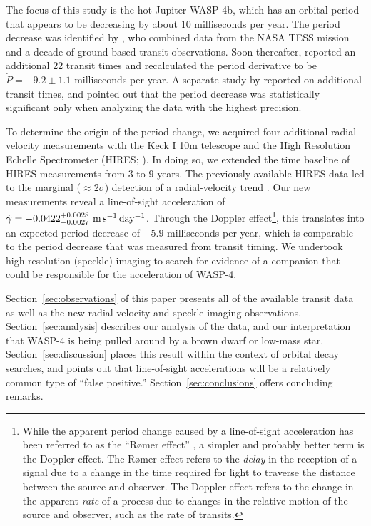 \documentclass[12pt,twocolumn,tighten]{aastex62}
\begin{document}
The focus of this study is the hot Jupiter WASP-4b, which has an
orbital period that appears to be decreasing by about 10 milliseconds
per year.  The period decrease was identified by \citep[][hereafter
]{bouma_wasp4b_2019}, who combined data
from the NASA TESS mission \citep{ricker_transiting_2015} and a decade
of ground-based transit observations. Soon thereafter,
\citet{southworth_transit_2019} reported an additional 22 transit
times and recalculated the period derivative to be $\dot{P} = -9.2 \pm
1.1$ milliseconds per year.  A separate study by \citet{baluev_2019}
reported on additional transit times, and pointed out that the period
decrease was statistically significant only when analyzing the data
with the highest precision.

To determine the origin of the period change, we acquired four
additional radial velocity measurements with the Keck I 10m telescope
and the High Resolution Echelle Spectrometer (HIRES;
\citealt{vogt_hires_1994}).  In doing so, we extended the time
baseline of HIRES measurements from 3 to 9 years.  The previously
available HIRES data led to the marginal ($\approx$$2\sigma$)
detection of a radial-velocity trend \citep{knutson_friends_2014}.
Our new measurements reveal a line-of-sight acceleration of
$\dot{\gamma} = -0.0422^{+0.0028}_{-0.0027}\ {\rm
m\,s^{-1}\,day^{-1}}$.  Through the Doppler effect\footnote{While the
apparent period change caused by a line-of-sight acceleration has been
referred to as the ``R{\o}mer effect'' \citep{yee_orbit_2020}, a
simpler and probably better term is the Doppler effect. The R{\o}mer
effect refers to the {\it delay} in the reception of a signal due to a
change in the time required for light to traverse the distance between
the source and observer. The Doppler effect refers to the change in
the apparent {\it rate} of a process due to changes in the relative
motion of the source and observer, such as the rate of transits.},
this translates into an expected period decrease of $-5.9$
milliseconds per year, which is comparable to the period decrease that
was measured from transit timing.  We undertook high-resolution
(speckle) imaging to search for evidence of a companion that could be
responsible for the acceleration of WASP-4.

Section~\ref{sec:observations} of this paper presents all of the
available transit data as well as the new radial velocity and speckle
imaging observations.  Section~\ref{sec:analysis} describes our
analysis of the data, and our interpretation that WASP-4 is being
pulled around by a brown dwarf or low-mass star.
Section~\ref{sec:discussion} places this result within the context of
orbital decay searches, and points out that line-of-sight
accelerations will be a relatively common type of ``false positive.''
Section~\ref{sec:conclusions} offers concluding remarks.
\end{document}
